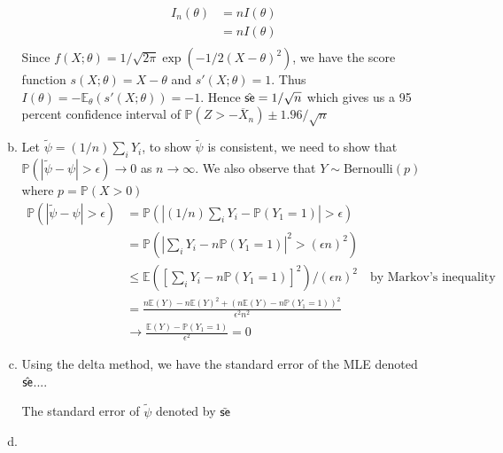 \documentclass[a4paper,10pt]{article}
\theoremstyle{definition}
\begin{document}
\begin{enumerate}
\begin{enumerate}[(a)]
\begin{align*}
I_n(\theta) &= nI(\theta)\\
&= nI(\theta)\\
\end{align*}
Since $f(X;\theta) = 1/\sqrt{2\pi}\exp(-1/2(X-\theta)^2)$, we have the score function $s(X;\theta) = X - \theta$ and $s'(X;\theta) = 1$. Thus $I(\theta) = -\mathbb{E}_\theta(s'(X;\theta))=-1$. Hence $\hat{\text{\sffamily se}} = 1/\sqrt{n}$ which gives us a 95 percent confidence interval of $\mathbb{P}\left( Z> -\overline{X}_n\right) \pm 1.96/\sqrt{n}$
\item Let $\tilde{\psi} = (1/n)\sum_iY_i$, to show $\tilde{\psi}$ is consistent, we need to show that $\mathbb{P}(|\tilde{\psi} - \psi|>\epsilon) \to 0$ as $n \to \infty$. We also observe that $Y\sim \text{Bernoulli}(p)$ where $p = \mathbb{P}(X>0)$
\begin{align*}
\mathbb{P}(|\tilde{\psi} - \psi|>\epsilon) &= \mathbb{P}(|(1/n)\sum_iY_i - \mathbb{P}(Y_1=1)|>\epsilon)\\
&=\mathbb{P}\left(\left|\sum_iY_i - n\mathbb{P}(Y_1=1)\right|^2>(\epsilon n)^2\right)\\
&\leq \mathbb{E}\left(\left[\sum_iY_i - n\mathbb{P}(Y_1=1)\right]^2\right)/(\epsilon n)^2\quad \text{by Markov's inequality}\\
&=\frac{n\mathbb{E}(Y)-n\mathbb{E}(Y)^2+\left(n\mathbb{E}(Y)-n\mathbb{P}(Y_1=1)\right)^2}{\epsilon^2n^2}\\
&\to \frac{\mathbb{E}(Y)-\mathbb{P}(Y_1=1)}{\epsilon^2}=0
\end{align*}
\item Using the delta method, we have the standard error of the {\sffamily MLE} denoted $\hat{\text{\sffamily se}}$....

The standard error of $\tilde{\psi}$ denoted by $\tilde{\text{\sffamily se}}$
\item
\end{enumerate}
\end{enumerate}
\end{document}
